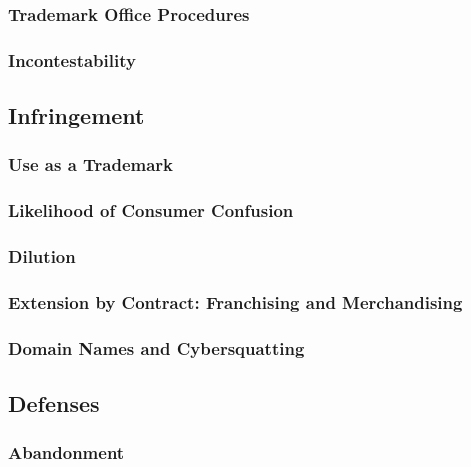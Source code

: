 \subsubsection{Trademark Office Procedures}


\subsubsection{Incontestability}


\subsection{Infringement}

\subsubsection{Use as a Trademark}


\subsubsection{Likelihood of Consumer Confusion}


\subsubsection{Dilution}


\subsubsection{Extension by Contract: Franchising and Merchandising}


\subsubsection{Domain Names and Cybersquatting}


\subsection{Defenses}

\subsubsection{Abandonment}

